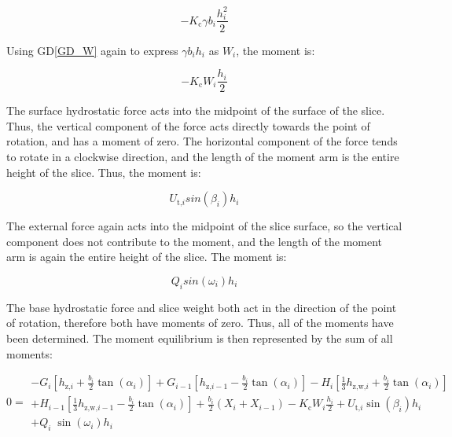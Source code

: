 \documentclass[12pt]{article}
\newcommand{\dref}[1]{GD\ref{#1}}
\begin{document}
\begin{equation*}
- K_{\text{c}} \gamma b_{i} \frac{h_{i}^2}{2}
\end{equation*}

\noindent Using \dref{GD_W} again to express $\gamma b_{i} h_{i}$ as $W_{i}$, 
the moment is:

\begin{equation*}
- K_{\text{c}} W_{i} \frac{h_{i}}{2}
\end{equation*}

\noindent The surface hydrostatic force acts into the midpoint of the surface 
of the slice. Thus, the vertical component of the force acts directly towards 
the point of rotation, and has a moment of zero. The horizontal component of 
the force tends to rotate in a clockwise direction, and the length of the 
moment arm is the entire height of the slice. Thus, the moment is:

\begin{equation*}
U_{\text{t,}i} sin(\beta_{i}) h_{i}
\end{equation*}

\noindent The external force again acts into the midpoint of the slice surface, 
so the vertical component does not contribute to the moment, and the length of 
the moment arm is again the entire height of the slice. The moment is:

\begin{equation*}
Q_{i} sin(\omega_{i}) h_{i}
\end{equation*}

\noindent The base hydrostatic force and slice weight both act in the direction 
of the point of rotation, therefore both have moments of zero. Thus, all of the 
moments have been determined. The moment equilibrium is then represented by the 
sum of all moments:

\begin{equation*}
0 = \begin{array}{l} - {G}_{i} \left[
{h_{\text{z,}i}} + \frac{b_{i}}{2} {
	\tan\left(\alpha_{i}\right)} \right] + {G}_{i-1}
\left[ {h_{\text{z,}i-1}} - \frac{b_{i}}{2} {
	\tan\left(\alpha_{i}\right)} \right] -
H_{i}\left[ \frac{1}{3} h_{\text{z,w,}i} + \frac{b_{i}}{2} {
	\tan\left(\alpha_{i}\right)} \right] \\[5pt] +
H_{i-1}\left[ \frac{1}{3} h_{\text{z,w,}i-1} - \frac{b_{i}}{2} {
	\tan\left(\alpha_{i}\right)} \right] +
\frac{b_{i}}{2} \left( X_{i} + X_{i-1}
\right) - K_{\text{c}} W_{i} \frac{h_{i}}{2} +
U_{\text{t,}i} \sin\left(\beta_{i}\right) h_{i} \\ +
Q_{i}\;{\sin\left(\omega_{i}\right)}
h_{i} \end{array}
\end{equation*}
\end{document}

